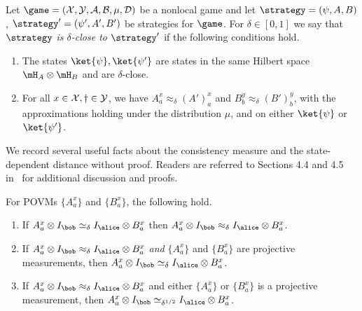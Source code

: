 \begin{definition}
  \label{def:strategy-distance}
  Let $\game = (\cal{X}, \cal{Y}, \cal{A}, \cal{B}, \mu, D)$ be a nonlocal game
  and let $\strategy = (\psi, A, B)$, $\strategy' = (\psi', A', B')$ be 
  strategies for $\game$.
  For $\delta\in[0,1]$ we say that \emph{$\strategy$ is $\delta$-close to
    $\strategy'$} if the following conditions hold.
  \begin{enumerate}
	\item The states $\ket{\psi}, \ket{\psi'}$ are states in the same
    Hilbert space $\mH_A \otimes \mH_B$ and are $\delta$-close.
	\item For all $x \in \cal{X}, y \in \cal{Y}$, we have $A^x_a \approx_\delta
    (A')^x_a$ and $B^y_b \approx_\delta (B')^y_b$, with the approximations
    holding under the distribution $\mu$, and on either $\ket{\psi}$ or
    $\ket{\psi'}$.
  \end{enumerate}
\end{definition}

We record several useful facts about the consistency measure and the
state-dependent distance without proof.
Readers are referred to Sections 4.4 and 4.5 in~\cite{NW19} for additional
discussion and proofs.

\begin{fact}
  \label{fact:agreement}
  For POVMs $\{A^x_a\}$ and $\{B^x_a\}$, the following hold.
  \begin{enumerate}
  \item If $A^x_a \otimes I_\bob \simeq_\delta I_\alice \otimes B^x_a$ then
    $A^x_a \otimes I_\bob \approx_\delta I_\alice \otimes B^x_a$.
    \label{item:consistency-implies-approx}
  \item If $A^x_a \otimes I_\bob \approx_\delta I_\alice \otimes B^x_a$
    \emph{and} $\{A^x_a\}$ and $\{B^x_a\}$ are projective measurements, then
    $A^x_a \otimes I_\bob \simeq_\delta I_\alice \otimes B^x_a$.
    \label{item:both-projectors-implies-consistency}
  \item If $A^x_a \otimes I_\bob \approx_\delta I_\alice \otimes B^x_a$ and
    either $\{A^x_a\}$ or $\{B^x_a\}$ is a projective measurement, then
    $A^x_a \otimes I_\bob \simeq_{\delta^{1/2}} I_\alice \otimes B^x_a$.
    \label{item:one-projector-implies-consistency}
  \end{enumerate}
\end{fact}

